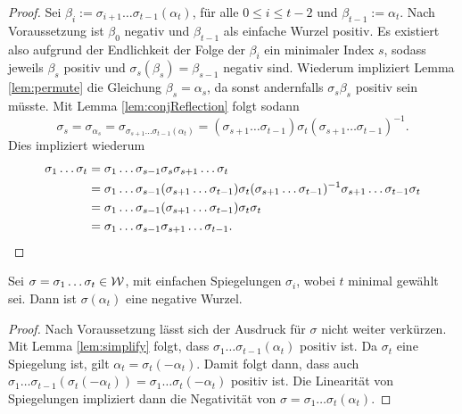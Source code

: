 \begin{proof}
  Sei $\beta_i := \sigma_{i + 1} \dots \sigma_{t-1}(\alpha_t)$, für alle $0 \leq i \leq t - 2$ und $\beta_{t - 1} := \alpha_t$.
  Nach Voraussetzung ist $\beta_0$ negativ und $\beta_{t - 1}$ als einfache Wurzel positiv.
  Es existiert also aufgrund der Endlichkeit der Folge der $\beta_i$ ein minimaler Index $s$, sodass jeweils $\beta_s$ positiv und $\sigma_s(\beta_s) = \beta_{s - 1}$ negativ sind.
  Wiederum impliziert Lemma \ref{lem:permute} die Gleichung $\beta_s = \alpha_s$, da sonst andernfalls $\sigma_s\beta_s$ positiv sein müsste.
  Mit Lemma \ref{lem:conjReflection} folgt sodann
  \begin{displaymath}
    \sigma_s 
    = \sigma_{\alpha_s} 
    = \sigma_{\sigma_{s+1} \dots \sigma_{t - 1}(\alpha_t)}
    = (\sigma_{s+1} \dots \sigma_{t - 1}) \sigma_{t} (\sigma_{s+1} \dots \sigma_{t - 1})^{-1}.
  \end{displaymath}
  Dies impliziert wiederum
  \begin{align*}
    \sigma_1 \dots \sigma_t 
    &= \sigma_1 \dots \sigma_{s - 1} \sigma_s \sigma_{s+1} \dots \sigma_t \\
    &= \sigma_1 \dots \sigma_{s - 1} (\sigma_{s+1} \dots \sigma_{t - 1}) \sigma_{t} (\sigma_{s+1} \dots \sigma_{t - 1})^{-1} \sigma_{s+1} \dots \sigma_{t - 1} \sigma_t\\
    &= \sigma_1 \dots \sigma_{s - 1} (\sigma_{s+1} \dots \sigma_{t - 1}) \sigma_t  \sigma_t\\
    &= \sigma_1 \dots \sigma_{s - 1} \sigma_{s+1} \dots \sigma_{t - 1}. \qedhere
  \end{align*}
\end{proof}

\begin{cor}
  \label{cor:minimalReflection}
  Sei $\sigma = \sigma_1 \dots \sigma_t \in \mathcal{W}$, mit einfachen Spiegelungen $\sigma_i$, wobei $t$ minimal gewählt sei. Dann ist $\sigma(\alpha_t)$ eine negative Wurzel.
\end{cor}

\begin{proof}
  Nach Voraussetzung lässt sich der Ausdruck für $\sigma$ nicht weiter verkürzen.
  Mit Lemma \ref{lem:simplify} folgt, dass $\sigma_1 \dots \sigma_{t-1}(\alpha_t)$ positiv ist.
  Da $\sigma_t$ eine Spiegelung ist, gilt $\alpha_t = \sigma_t(-\alpha_t)$.
  Damit folgt dann, dass auch $\sigma_1 \dots \sigma_{t-1}(\sigma_t(-\alpha_t)) = \sigma_1 \dots \sigma_t(-\alpha_t)$ positiv ist.
  Die Linearität von Spiegelungen impliziert dann die Negativität von $\sigma = \sigma_1 \dots \sigma_t(\alpha_t)$.
\end{proof}
